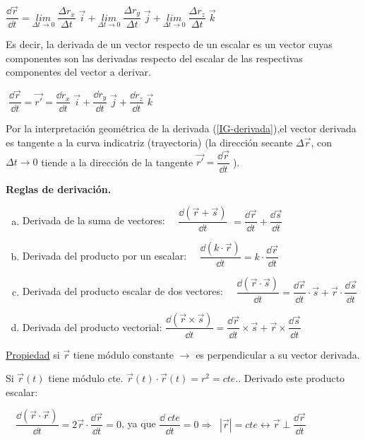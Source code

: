 $\dfrac {\dd \vec r}{\dd t }= \underset{\Delta t \to 0}{lim}\; {\dfrac {\Delta r_x}{\Delta t}\;  \vec i} + \underset{\Delta t \to 0}{lim}\; {\dfrac {\Delta r_y}{\Delta t}\;  \vec j} + \underset{\Delta t \to 0}{lim}\; {\dfrac {\Delta r_z}{\Delta t}\;  \vec k}$

Es decir, la derivada de un vector respecto de un escalar es un vector cuyas componentes son las derivadas respecto del escalar de las respectivas componentes del vector a derivar.

\hspace{30mm}$\boxed{ \; \dfrac {\dd \vec r}{\dd t }= \overrightarrow {r'} = \dfrac {\dd r_x}{\dd t}\; \vec i + \dfrac {\dd r_y}{\dd t}\; \vec j + \dfrac {\dd r_z}{\dd t}\; \vec k\; }$

Por la interpretación geométrica de la derivada (\ref{IG-derivada}),el vector derivada es tangente a la curva indicatriz (trayectoria) (la dirección secante $\Delta \vec r$, con $\Delta t \to 0$ tiende a la dirección de la tangente $  \overrightarrow { r'} =\dfrac {\dd \vec r}{\dd t }\;$).

\vspace{4mm} \textbf {Reglas de derivación.} 

\begin{enumerate}[a) ]
\item Derivada de la suma de vectores: 
$\quad \dfrac {\dd {(\vec r + \vec s)}}{\dd t }$
$=\dfrac {\dd \vec r}{\dd t }+\dfrac {\dd \vec s}{\dd t }$

\item Derivada del producto por un escalar: $\quad \dfrac {\dd {(k\cdot \vec r)}}{\dd t }= k\cdot \dfrac {\dd \vec r}{\dd t }$
\item Derivada del producto escalar de dos vectores: $\quad \dfrac {\dd (\vec r \cdot \vec s)}{\dd t } = \dfrac {\dd \vec r}{\dd t }\cdot \vec s + \vec r \cdot \dfrac {\dd \vec s}{\dd t }$
\item Derivada del producto vectorial: $\dfrac {\dd (\vec r \times \vec s)}{\dd t }= \dfrac {\dd \vec r}{\dd t }\times \vec s + \vec r \times \dfrac {\dd \vec s}{\dd t }$	
\end{enumerate}

\underline{Propiedad} si $\vec r$ tiene módulo constante $\to$ es perpendicular a su vector derivada.

\begin{proofw}\renewcommand{\qedsymbol}{$\diamond$}

Si $\vec r (t)$ tiene módulo cte. $\vec r (t) \cdot \vec r (t)= r^2 =cte.$. Derivado este producto escalar:

$\quad \dfrac {\dd (\vec r \cdot \vec r)}{\dd t }=2\vec r \cdot \dfrac {\dd \vec r}{\dd t}=0$, ya que $\dfrac {\dd \; cte}{\dd t}=0 \Rightarrow \; \boxed{\; |\vec r|=cte \leftrightarrow \displaystyle \vec r \; \bot \;  \dfrac {\dd \vec r}{\dd t }\;} $
\end{proofw}

